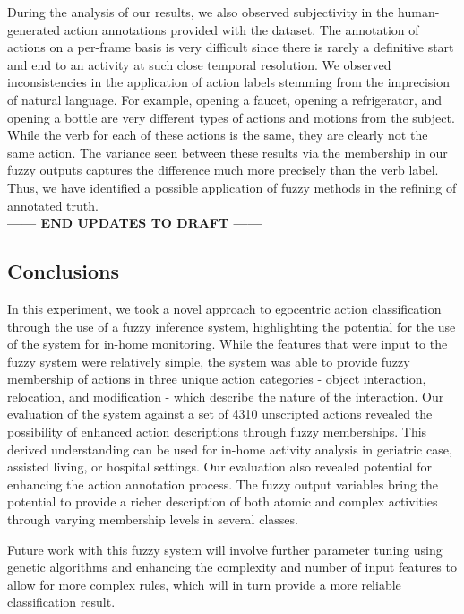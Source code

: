 \documentclass[12pt]{report}
\begin{document}
During the analysis of our results, we also observed subjectivity in the human-generated action annotations provided with the dataset. The annotation of actions on a per-frame basis is very difficult since there is rarely a definitive start and end to an activity at such close temporal resolution. We observed inconsistencies in the application of action labels stemming from the imprecision of natural language. For example, opening a faucet, opening a refrigerator, and opening a bottle are very different types of actions and motions from the subject. While the verb for each of these actions is the same, they are clearly not the same action. The variance seen between these results via the membership in our fuzzy outputs captures the difference much more precisely than the verb label. Thus, we have identified a possible application of fuzzy methods in the refining of annotated truth.
\\
\textbf{------ END UPDATES TO DRAFT ------}
\\


\subsection{Conclusions}
In this experiment, we took a novel approach to egocentric action classification through the use of a fuzzy inference system, highlighting the potential for the use of the system for in-home monitoring. While the features that were input to the fuzzy system were relatively simple, the system was able to provide fuzzy membership of actions in three unique action categories - object interaction, relocation, and modification - which describe the nature of the interaction. Our evaluation of the system against a set of 4310 unscripted actions revealed the possibility of enhanced action descriptions through fuzzy memberships. This derived understanding can be used for in-home activity analysis in geriatric case, assisted living, or hospital settings. Our evaluation also revealed potential for enhancing the action annotation process. The fuzzy output variables bring the potential to provide a richer description of both atomic and complex activities through varying membership levels in several classes.

Future work with this fuzzy system will involve further parameter tuning using genetic algorithms and enhancing the complexity and number of input features to allow for more complex rules, which will in turn provide a more reliable classification result.
\end{document}

